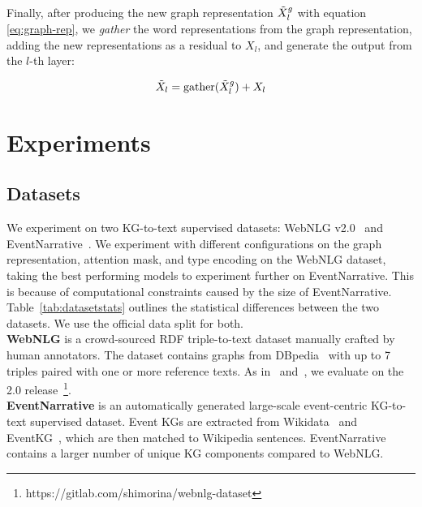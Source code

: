 \documentclass[11pt]{article}
\begin{document}
Finally, after producing the new graph representation $\Tilde{X}_l^g$ with equation \eqref{eq:graph-rep}, we \emph{gather} the word representations from the graph representation, adding the new representations as a residual to $X_l$, and generate the output from the $l$-th layer:

\begin{equation}
    \Tilde{X}_l = \operatorname{gather}(\Tilde{X}_l^g) + X_l
\end{equation}

\section{Experiments}
\subsection{Datasets}



\begin{table}[]
\centering
{}
\caption{\label{tab:datasetstats} Statistics of the supervised KG-to-Text datasets used for experimenting.}
\end{table}

We experiment on two KG-to-text supervised datasets: WebNLG v2.0~\cite{gardent2017webnlg,shimorina2018handling} and EventNarrative~\cite{colas2021eventnarrative}. We experiment with different configurations on the graph representation, attention mask, and type encoding on the WebNLG dataset, taking the best performing models to experiment further on EventNarrative. This is because of computational constraints caused by the size of EventNarrative. Table~\ref{tab:datasetstats} outlines the statistical differences between the two datasets. We use the official data split for both. \\
\textbf{WebNLG} is a crowd-sourced RDF triple-to-text dataset manually crafted by human annotators. The dataset contains graphs from DBpedia~\cite{auer2007dbpedia} with up to 7 triples paired with one or more reference texts. 
As in~\citet{chen-etal-2020-kgpt} and~\citet{ke-etal-2021-jointgt}, we evaluate on the 2.0 release~\footnote{https://gitlab.com/shimorina/webnlg-dataset}.
\\
\textbf{EventNarrative} is an automatically generated large-scale event-centric KG-to-text supervised dataset. Event KGs are extracted from Wikidata~\cite{vrandevcic2014wikidata} and EventKG~\cite{gottschalk2018eventkg}, which are then matched to Wikipedia sentences. EventNarrative contains a larger number of unique KG components compared to WebNLG. 
\end{document}
